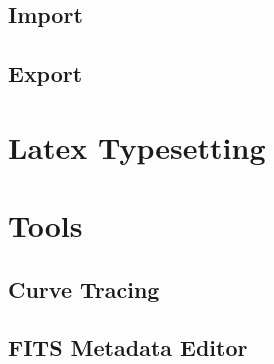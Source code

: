 \section{Import}
\section{Export}

\chapter{Latex Typesetting}

\chapter{Tools}
\section{Curve Tracing}
\section{FITS Metadata Editor}

